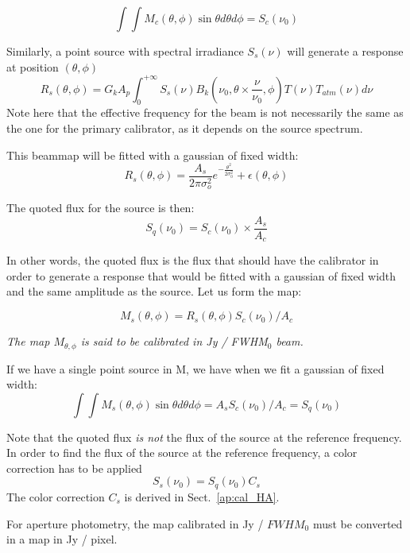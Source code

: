 \begin{equation}
\int\int M_{c}(\theta, \phi) \sin \theta d\theta d\phi = S_{c}(\nu_{0})
\end{equation}


Similarly, a point source with spectral irradiance $S_{s}(\nu)$ will
generate a response at position $(\theta, \phi)$
\begin{equation}
R_{s}(\theta, \phi) =  G_{k} A_{p}  \int_{0}^{+\infty}
S_{s}(\nu) B_{k}(\nu_{0}, \theta \times \frac{\nu}{\nu_{0}},
\phi) T(\nu) T_{atm}(\nu) d\nu
\end{equation}
Note here that the effective frequency for the beam is not necessarily
the same as the one for the primary calibrator, as it depends on the
source spectrum.


This beammap will be fitted with a gaussian of fixed width:
\begin{equation} 
R_{s}(\theta, \phi)  = \frac{A_{s}}{2 \pi \sigma_{o}^{2}}
e^{-\frac{\theta^{2}}{2\sigma_{0}^{2}}}  + \epsilon(\theta, \phi)
\end{equation}

The quoted flux for the source is then:
\begin{equation}
S_{q}(\nu_{0}) =  S_{c} (\nu_{0})  \times \frac{A_{s}}{A_{c}}
\end{equation}

In other words, the quoted flux is the flux that should have the
calibrator in order to generate a response that would be fitted with a
gaussian of fixed width and the same amplitude as the source.
Let us form the map:

\begin{equation}
M_{s}(\theta, \phi) = R_{s}(\theta, \phi)   S_{c} (\nu_{0}) / A_{c}
\end{equation}

 {\em The map $M_{\theta, \phi}$ is said to be calibrated in Jy / FWHM$_{0}$ beam.}

If we have a single point source in M, we have when we fit a gaussian
of fixed width:
\begin{equation}
\int \int M_{s}(\theta, \phi) \sin \theta d\theta d\phi = A_{s}  S_{c} (\nu_{0}) /
A_{c} = S_{q}(\nu_{0})
\end{equation}


Note that the quoted flux {\em is not} the flux of the source at the
reference frequency. In order to find the flux of the source at the
reference frequency, a color correction has to be applied
\begin{equation}
S_{s}(\nu_{0}) = S_{q}(\nu_{0})  C_{s}
\end{equation}
The color correction $C_{s}$ is derived in Sect.~\ref{ap:cal_HA}. 


For aperture photometry, the map calibrated in Jy / $FWHM_{0}$ must be
converted in a map in Jy / pixel. 

